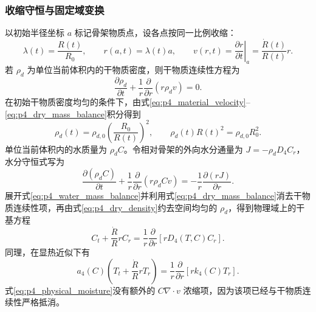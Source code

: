 \documentclass[withoutpreface,bwprint]{cumcmthesis}
\begin{document}
\subsubsection{收缩守恒与固定域变换}

以初始半径坐标 $a$ 标记骨架物质点，设各点按同一比例收缩：
\begin{equation}
\lambda(t)=\frac{R(t)}{R_0},\qquad
r(a,t)=\lambda(t)a,\qquad
v(r,t)=\left.\frac{\partial r}{\partial t}\right|_a
=\frac{\dot R(t)}{R(t)}r.
\label{eq:p4_material_velocity}
\end{equation}
若 $\rho_d$ 为单位当前体积内的干物质密度，则干物质连续性方程为
\begin{equation}
\frac{\partial\rho_d}{\partial t}
+\frac{1}{r}\frac{\partial}{\partial r}(r\rho_dv)=0.
\label{eq:p4_dry_mass_balance}
\end{equation}
在初始干物质密度均匀的条件下，由式\eqref{eq:p4_material_velocity}--\eqref{eq:p4_dry_mass_balance}积分得到
\begin{equation}
\rho_d(t)=\rho_{d,0}\left(\frac{R_0}{R(t)}\right)^2,
\qquad \rho_d(t)R(t)^2=\rho_{d,0}R_0^2.
\label{eq:p4_dry_density}
\end{equation}
单位当前体积内的水质量为 $\rho_dC$。令相对骨架的外向水分通量为 $J=-\rho_dD_4C_r$，水分守恒式写为
\begin{equation}
\frac{\partial(\rho_dC)}{\partial t}
+\frac{1}{r}\frac{\partial}{\partial r}(r\rho_dCv)
=-\frac{1}{r}\frac{\partial(rJ)}{\partial r}.
\label{eq:p4_water_mass_balance}
\end{equation}
展开式\eqref{eq:p4_water_mass_balance}并利用式\eqref{eq:p4_dry_mass_balance}消去干物质连续性项，再由式\eqref{eq:p4_dry_density}约去空间均匀的 $\rho_d$，得到物理域上的干基方程
\begin{equation}
C_t+\frac{\dot R}{R}rC_r
=\frac{1}{r}\frac{\partial}{\partial r}\left[rD_4(T,C)C_r\right].
\label{eq:p4_physical_moisture}
\end{equation}
同理，在显热近似下有
\begin{equation}
a_4(C)\left(T_t+\frac{\dot R}{R}rT_r\right)
=\frac{1}{r}\frac{\partial}{\partial r}\left[rk_4(C)T_r\right].
\label{eq:p4_physical_heat}
\end{equation}
式\eqref{eq:p4_physical_moisture}没有额外的 $C\nabla\!\cdot v$ 浓缩项，因为该项已经与干物质连续性严格抵消。
\end{document}
